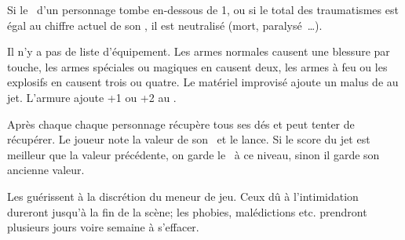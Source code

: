 {		Si le \HD\ d'un personnage tombe en-dessous de 1, ou si le total des traumatismes est égal au chiffre actuel de son \HD, il est neutralisé (mort, paralysé~\ldots).


		\noindent
		Il n'y a pas de liste d'équipement. Les armes normales causent une blessure par touche, les armes spéciales ou magiques en causent deux, les armes à feu ou les explosifs en causent trois ou quatre. Le matériel improvisé ajoute un malus de  au jet. L'armure ajoute +1 ou +2 au \RD.


		\noindent
		Après chaque  chaque personnage récupère tous ses dés et peut tenter de récupérer. Le joueur note la valeur de son \HD\ et le lance. Si le score du jet est meilleur que la valeur précédente, on garde le \HD\ à ce niveau, sinon il garde son ancienne valeur.

		Les  guérissent à la discrétion du meneur de jeu. Ceux dû à l'intimidation dureront jusqu'à la fin de la scène; les phobies, malédictions etc. prendront plusieurs jours voire semaine à s'effacer.
}

